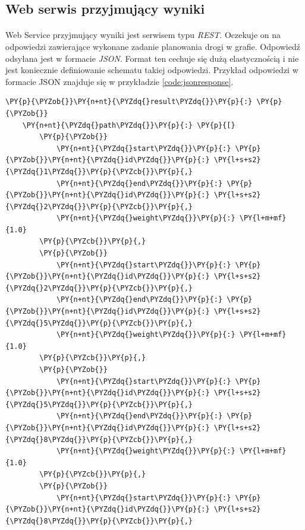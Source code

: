 \subsection{Web serwis przyjmujący wyniki}
\paragraph{}
Web Service przyjmujący wyniki jest serwisem typu {\it REST}.
Oczekuje on na odpowiedzi zawierające wykonane zadanie planowania drogi w grafie.
Odpowiedź odsyłana jest w formacie {\it JSON}.
Format ten cechuje się dużą elastycznością i nie jest koniecznie definiowanie schematu takiej odpowiedzi.
Przykład odpowiedzi w formacie JSON znajduje się w przykładzie \ref{code:jsonresponse}.

\begin{program}
\begin{code}
\begin{Verbatim}[commandchars=\\\{\}]
\PY{p}{\PYZob{}}\PY{n+nt}{\PYZdq{}result\PYZdq{}}\PY{p}{:} \PY{p}{\PYZob{}}
    \PY{n+nt}{\PYZdq{}path\PYZdq{}}\PY{p}{:} \PY{p}{[}
        \PY{p}{\PYZob{}}
            \PY{n+nt}{\PYZdq{}start\PYZdq{}}\PY{p}{:} \PY{p}{\PYZob{}}\PY{n+nt}{\PYZdq{}id\PYZdq{}}\PY{p}{:} \PY{l+s+s2}{\PYZdq{}1\PYZdq{}}\PY{p}{\PYZcb{}}\PY{p}{,}
            \PY{n+nt}{\PYZdq{}end\PYZdq{}}\PY{p}{:} \PY{p}{\PYZob{}}\PY{n+nt}{\PYZdq{}id\PYZdq{}}\PY{p}{:} \PY{l+s+s2}{\PYZdq{}2\PYZdq{}}\PY{p}{\PYZcb{}}\PY{p}{,}
            \PY{n+nt}{\PYZdq{}weight\PYZdq{}}\PY{p}{:} \PY{l+m+mf}{1.0}
        \PY{p}{\PYZcb{}}\PY{p}{,}
        \PY{p}{\PYZob{}}
            \PY{n+nt}{\PYZdq{}start\PYZdq{}}\PY{p}{:} \PY{p}{\PYZob{}}\PY{n+nt}{\PYZdq{}id\PYZdq{}}\PY{p}{:} \PY{l+s+s2}{\PYZdq{}2\PYZdq{}}\PY{p}{\PYZcb{}}\PY{p}{,}
            \PY{n+nt}{\PYZdq{}end\PYZdq{}}\PY{p}{:} \PY{p}{\PYZob{}}\PY{n+nt}{\PYZdq{}id\PYZdq{}}\PY{p}{:} \PY{l+s+s2}{\PYZdq{}5\PYZdq{}}\PY{p}{\PYZcb{}}\PY{p}{,}
            \PY{n+nt}{\PYZdq{}weight\PYZdq{}}\PY{p}{:} \PY{l+m+mf}{1.0}
        \PY{p}{\PYZcb{}}\PY{p}{,}
        \PY{p}{\PYZob{}}
            \PY{n+nt}{\PYZdq{}start\PYZdq{}}\PY{p}{:} \PY{p}{\PYZob{}}\PY{n+nt}{\PYZdq{}id\PYZdq{}}\PY{p}{:} \PY{l+s+s2}{\PYZdq{}5\PYZdq{}}\PY{p}{\PYZcb{}}\PY{p}{,}
            \PY{n+nt}{\PYZdq{}end\PYZdq{}}\PY{p}{:} \PY{p}{\PYZob{}}\PY{n+nt}{\PYZdq{}id\PYZdq{}}\PY{p}{:} \PY{l+s+s2}{\PYZdq{}8\PYZdq{}}\PY{p}{\PYZcb{}}\PY{p}{,}
            \PY{n+nt}{\PYZdq{}weight\PYZdq{}}\PY{p}{:} \PY{l+m+mf}{1.0}
        \PY{p}{\PYZcb{}}\PY{p}{,}
        \PY{p}{\PYZob{}}
            \PY{n+nt}{\PYZdq{}start\PYZdq{}}\PY{p}{:} \PY{p}{\PYZob{}}\PY{n+nt}{\PYZdq{}id\PYZdq{}}\PY{p}{:} \PY{l+s+s2}{\PYZdq{}8\PYZdq{}}\PY{p}{\PYZcb{}}\PY{p}{,}

\end{Verbatim}
\end{code}
\end{program}
